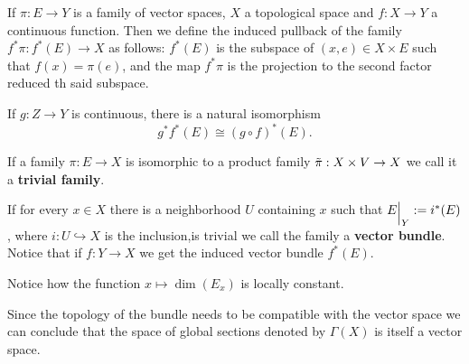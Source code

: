 \begin{definition} \label{def: Pullback of a family of vector spaces}
	If $\pi:E\to Y$ is a family of vector spaces, $X$ a topological space and $f:X\to Y  $ a continuous function. Then we define the induced pullback of the family $f^*{\pi}:f^*(E) \to X$ as follows: 
	$f^*(E)$ is the subspace of $(x,e)\in X\times E$ such that $f(x)=\pi(e)$, and the map $f^*{\pi}$ is the projection to the second factor reduced th said subspace. 
\end{definition}



\begin{corollary} \label{cor: pullback is functoriell}
	If $g:Z\to Y$ is continuous, there is a natural isomorphism $$g^*f^*(E)\cong (g\circ f)^*(E).$$ 
\end{corollary}
\begin{definition}\label{def: Trivial bundle}
	If a family $\pi: E \to X$ is isomorphic to a product family $\Tilde{\pi}:X\times V\to X$ we call it a \textbf{trivial family}.
\end{definition}
\begin{definition}\label{def: Vector bundle}
	If for every $x\in X$ there is a neighborhood $U$ containing $x$ such that $E\einsch{Y}:=i^*(E)$, where $i:U\hookrightarrow X$ is the inclusion,is trivial we call the family a \textbf{vector bundle}. Notice that if $f:Y\to X$ we get the induced vector bundle $f^*(E)$.  
\end{definition}



\begin{corollary}
	Notice how the function $x\mapsto \dim(E_x)$ is locally constant.
\end{corollary}
\begin{corollary}
	Since the topology of the bundle needs to be compatible with the vector space we can conclude that the space of global sections denoted by $\Gamma(X)$ is itself a vector space.
\end{corollary}


